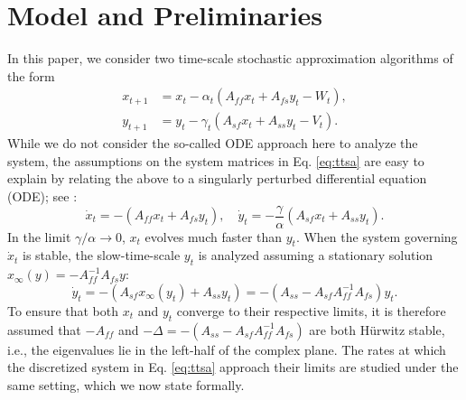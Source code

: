 \section{Model and Preliminaries}\label{sec:preliminaries}
In this paper, we consider two time-scale stochastic approximation algorithms of the form
\begin{equation}
    \begin{split}
        x_{t+1} &= x_t - \alpha_t \left(A_{ff} x_t + A_{fs} y_t - W_t \right),
        \\
        y_{t+1} &= y_t - \gamma_t \left(A_{sf} x_t + A_{ss} y_t - V_t \right).
    \end{split}\label{eq:ttsa}
\end{equation}
While we do not consider the so-called ODE approach here to analyze the system, the assumptions on the system matrices in Eq. \eqref{eq:ttsa} are easy to explain by relating the above to a singularly perturbed differential equation (ODE); see \citep{borkar2008stochastic}:
\begin{equation}
    \dot{x}_t = - (A_{ff} x_t + A_{fs} y_t) , 
    \quad
    \dot{y}_t = - \frac{\gamma}{\alpha} \left(A_{sf} x_t + A_{ss} y_t \right).
\end{equation}
In the limit $\gamma/\alpha \to 0$, $x_t$ evolves much faster than $y_t$.
When the system governing $\dot{x}_t$ is stable, the slow-time-scale $y_t$ is analyzed assuming a stationary solution $x_\infty (y) = -A_{ff}^{-1} A_{fs} y$:
\begin{equation}
    \dot{y}_t = -\left(A_{sf} x_\infty (y_t) + A_{ss} y_t\right) 
    = -(A_{ss} - A_{sf} A_{ff}^{-1} A_{fs}) y_t
    .
\end{equation}
To ensure that both $x_t$ and $y_t$ converge to their respective limits, it is therefore assumed that $-A_{ff}$ and $-\Delta = -(A_{ss} - A_{sf} A_{ff}^{-1} A_{fs})$ are both H\"{u}rwitz stable, i.e., the eigenvalues lie in the left-half of the complex plane. 
The rates at which the discretized system in Eq. \eqref{eq:ttsa} approach their limits are studied under the same setting, which we now state formally. 
